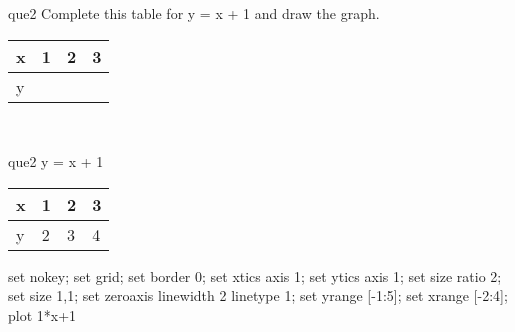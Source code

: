 \documentclass[13.5pt, varwidth=true]{beamer}
\begin{document}
\begin{frame}[shrink=19,fragile]
	\begin{beamercolorbox}[rounded=true, left, shadow=true,wd=14.8cm]{que2}
		 Complete this table for y = x + 1 and draw the graph. \\[0.3cm] \renewcommand{\arraystretch}{1.2}\begin{tabular}{|C|C|C|C|} \hline x & 1 & 2 & 3 \\ \hline y & & & \\ \hline \end{tabular}\\[0.3cm]
	\end{beamercolorbox}
\end{frame}
\begin{frame}[shrink=19,fragile]
	\begin{beamercolorbox}[rounded=true, left, shadow=true,wd=14.8cm]{que2}
		y = x + 1\renewcommand{\arraystretch}{1.2}\begin{tabular}{|C|C|C|C|} \hline x & 1 & 2 & 3 \\ \hline y & 2 & 3 & 4\\ \hline \end{tabular}\begin{gnuplot}[terminal=pdf] set nokey; set grid; set border 0; set xtics axis 1; set ytics axis 1; set size ratio 2; set size 1,1; set zeroaxis linewidth 2 linetype 1; set yrange [-1:5]; set xrange [-2:4]; plot 1*x+1 \end{gnuplot}
	\end{beamercolorbox}
\end{frame}
\end{document}
